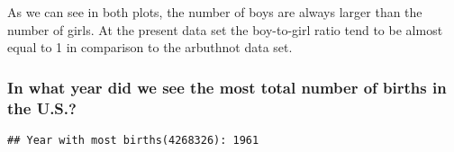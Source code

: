 \documentclass[
]{article}
\newenvironment{Shaded}{\begin{snugshade}}{\end{snugshade}}
\newcommand{\KeywordTok}[1]{\textcolor[rgb]{0.13,0.29,0.53}{\textbf{#1}}}
\newcommand{\NormalTok}[1]{#1}
\newcommand{\OperatorTok}[1]{\textcolor[rgb]{0.81,0.36,0.00}{\textbf{#1}}}
\newcommand{\StringTok}[1]{\textcolor[rgb]{0.31,0.60,0.02}{#1}}
\begin{document}
As we can see in both plots, the number of boys are always larger than
the number of girls. At the present data set the boy-to-girl ratio tend
to be almost equal to 1 in comparison to the arbuthnot data set.

\hypertarget{in-what-year-did-we-see-the-most-total-number-of-births-in-the-u.s.}{%
\subsubsection{In what year did we see the most total number of births
in the
U.S.?}\label{in-what-year-did-we-see-the-most-total-number-of-births-in-the-u.s.}}

\begin{Shaded}
\end{Shaded}

\begin{verbatim}
## Year with most births(4268326): 1961
\end{verbatim}
\end{document}
